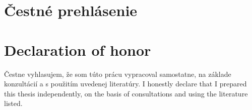\thispagestyle{empty}

\vspace*{\fill}

\ifx\FIITlagEN\undefined
	\section*{Čestné prehlásenie}
\else
	\section*{Declaration of honor}
\fi

\ifx\FIITlagEN\undefined
	Čestne vyhlasujem, že som túto prácu vypracoval samostatne, na základe konzultácií a s použitím uvedenej literatúry.
\else
	I honestly declare that I prepared this thesis independently, on the basis of consultations and using the literature listed.
\fi

\bigskip{}

\ifx\FIITlagEN\undefined
	\FIITsignPlaceSK \FIITsignDate
\else
	\FIITsignPlace \FIITsignDate
\fi
\hspace*{\fill} \signaturespace{5cm}{\FIITauthor}

\emptypage
